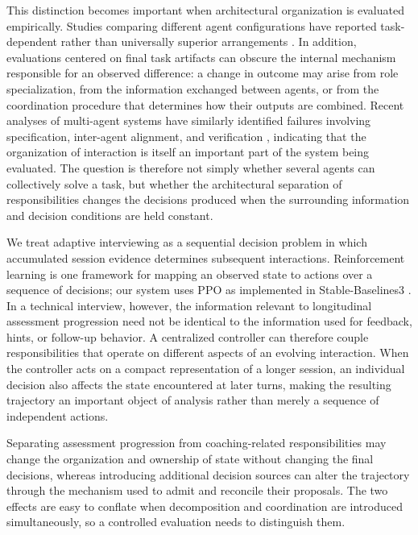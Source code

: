 \documentclass[runningheads]{llncs}
\begin{document}
This distinction becomes important when architectural organization is evaluated empirically. Studies comparing different agent configurations have reported task-dependent rather than universally superior arrangements \cite{kim2026artifact,kim2026outgrow}. In addition, evaluations centered on final task artifacts can obscure the internal mechanism responsible for an observed difference: a change in outcome may arise from role specialization, from the information exchanged between agents, or from the coordination procedure that determines how their outputs are combined. Recent analyses of multi-agent systems have similarly identified failures involving specification, inter-agent alignment, and verification \cite{cemri2025}, indicating that the organization of interaction is itself an important part of the system being evaluated. The question is therefore not simply whether several agents can collectively solve a task, but whether the architectural separation of responsibilities changes the decisions produced when the surrounding information and decision conditions are held constant.

We treat adaptive interviewing as a sequential decision problem in which accumulated session evidence determines subsequent interactions. Reinforcement learning is one framework for mapping an observed state to actions over a sequence of decisions; our system uses PPO \cite{schulman2017} as implemented in Stable-Baselines3 \cite{raffin2021}. In a technical interview, however, the information relevant to longitudinal assessment progression need not be identical to the information used for feedback, hints, or follow-up behavior. A centralized controller can therefore couple responsibilities that operate on different aspects of an evolving interaction. When the controller acts on a compact representation of a longer session, an individual decision also affects the state encountered at later turns, making the resulting trajectory an important object of analysis rather than merely a sequence of independent actions.

Separating assessment progression from coaching-related responsibilities may change the organization and ownership of state without changing the final decisions, whereas introducing additional decision sources can alter the trajectory through the mechanism used to admit and reconcile their proposals. The two effects are easy to conflate when decomposition and coordination are introduced simultaneously, so a controlled evaluation needs to distinguish them.
\end{document}
